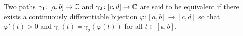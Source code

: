 \documentclass[11pt,a4paper]{article}
\begin{document}
\begin{definition}
  Two paths $\gamma_1 \colon [a, b] \to \mathbb{C}$ and 
  $\gamma_2 \colon [c, d] \to \mathbb{C}$ are said to be
  equivalent if there exists a continuously differentiable bijection 
  $\varphi \colon [a, b] \to [c, d]$ so
  that $\varphi'(t) > 0$ and $\gamma_1(t) = \gamma_2(\varphi(t))$
  for all $t \in [a, b]$.
\end{definition}
\end{document}
